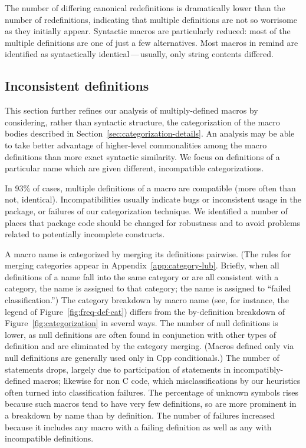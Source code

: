 \documentclass[10pt]{article}
\newcommand{\pkg}[1]{\textsf{#1}}
\begin{document}
The number of differing canonical redefinitions is dramatically lower than
the number of redefinitions, indicating that multiple definitions are not
so worrisome as they initially appear.  Syntactic macros are particularly
reduced: most of the multiple definitions are one of just a few
alternatives.  Most macros in \pkg{remind} are identified as syntactically
identical\,---\,usually, only string contents differed.


\subsection{Inconsistent definitions}
\label{sec:inconsistent}


This section further refines our analysis of multiply-defined macros by
considering, rather than syntactic structure, the categorization of the
macro bodies described in Section~\ref{sec:categorization-details}.  An
analysis may be able to take better advantage of higher-level commonalities
among the macro definitions than more exact syntactic similarity.  We focus
on definitions of a particular name which are given different, incompatible
categorizations.


In 93\% of cases, multiple definitions of a macro are compatible (more
often than not, identical).  Incompatibilities usually indicate bugs or
inconsistent usage in the package, or failures of our categorization
technique.  We identified a number of places that package code should be
changed for robustness and to avoid problems related to potentially
incomplete constructs.


A macro name is categorized by merging its definitions pairwise.  (The
rules for merging categories appear in Appendix~\ref{app:category-lub}.
Briefly, when all definitions of a name fall into the same category or are
all consistent with a category, the name is assigned to that category; the
name is assigned to ``failed classification.'')  The category breakdown by
macro name (see, for instance, the legend of Figure~\ref{fig:freq-def-cat})
differs from the by-definition breakdown of Figure~\ref{fig:categorization}
in several ways.  The number of null definitions is lower, as null
definitions are often found in conjunction with other types of definition
and are eliminated by the category merging.  (Macros defined only via null
definitions are generally used only in Cpp conditionals.)  The number of
statements drops, largely due to participation of statements in
incompatibly-defined macros; likewise for non C code, which
misclassifications by our heuristics often turned into classification
failures.  The percentage of unknown symbols rises because such macros tend to
have very few definitions, so are more prominent
in a breakdown by name than by definition.  The number of failures
increased because it includes any macro with a failing definition as well
as any with incompatible definitions.
\end{document}
